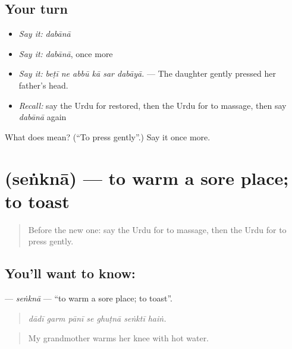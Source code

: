 \subsection*{Your turn}
\begin{itemize}
\raggedright
  \item \emph{Say it:} \emph{dabānā}
  \item \emph{Say it:} \emph{dabānā}, once more
  \item \emph{Say it:} \emph{beṭī ne abbū kā sar dabāyā.} — The daughter gently pressed her father's head.
  \item \emph{Recall:} say the Urdu for restored, then the Urdu for to massage, then say \emph{dabānā} again
\end{itemize}

\begin{tcolorbox}[breakable,colback=teal!4,colframe=teal!35!black,title={Before you move on}]
What does  mean? (\textquotedblleft{}To press gently\textquotedblright{}.) Say it once more.
\end{tcolorbox}
\section[\texorpdfstring{\ur{سینکنا} (seṅknā)}{سینکنا (seṅknā)}]{ (seṅknā) — to warm a sore place; to toast}

\label{lesson:UR-C481-senkna}



\begin{quote}
Before the new one: say the Urdu for to massage, then the Urdu for to press gently.
\end{quote}

\subsection*{You'll want to know: }
\textbf{} — \emph{seṅknā} — \textquotedblleft{}to warm a sore place; to toast\textquotedblright{}.

\begin{quote}
      
\end{quote}

\begin{quote}
\emph{dādī garm pānī se ghuṭnā seṅktī haiṅ.}
\end{quote}

\begin{quote}
My grandmother warms her knee with hot water.
\end{quote}

